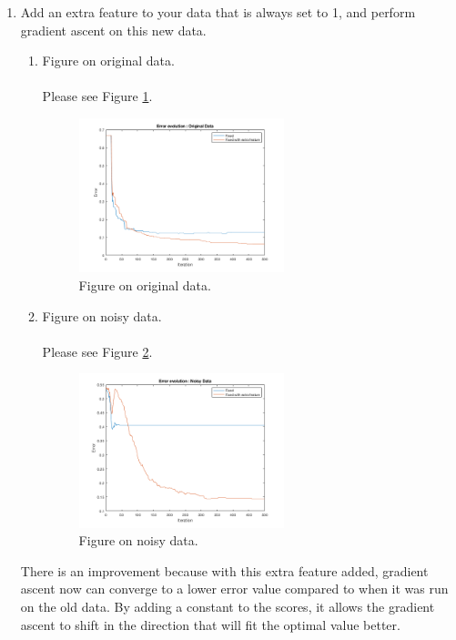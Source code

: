 \documentclass[english]{article}
\begin{document}
\begin{enumerate}[label=(\roman*)]
\begin{enumerate}
      \item Add an extra feature to your data that is always set to 1, and perform gradient ascent on this new data.
      \begin{enumerate}
        \item Figure on original data.\\ \\
        Please see Figure \ref{fig:321}. \\
        \begin{figure}[H]
          \centering
          \includegraphics[width=0.6\textwidth]{321.png}
          \caption{Figure on original data.}
          \label{fig:321}
        \end{figure}
        \item Figure on noisy data.\\ \\
        Please see Figure \ref{fig:322}. \\
        \begin{figure}[H]
          \centering
          \includegraphics[width=0.6\textwidth]{322.png}
          \caption{Figure on noisy data.}
          \label{fig:322}
        \end{figure}
      \end{enumerate}

      There is an improvement because with this extra feature added, gradient ascent now can converge to a lower error value compared to when it was run on the old data. By adding a constant to the scores, it allows the gradient ascent to shift in the direction that will fit the optimal value better.\\


\end{enumerate}
\end{enumerate}
\end{document}
